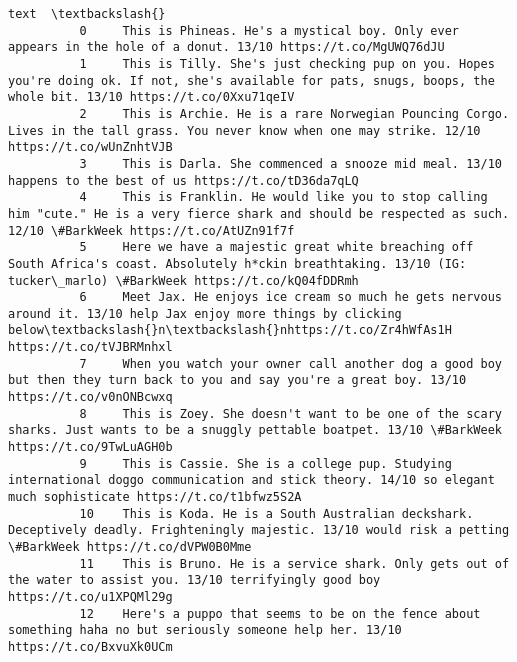 \documentclass[11pt]{article}
\begin{document}
\begin{Verbatim}[commandchars=\\\{\}]
                                                                                                                                                                                  text  \textbackslash{}
          0     This is Phineas. He's a mystical boy. Only ever appears in the hole of a donut. 13/10 https://t.co/MgUWQ76dJU                                                            
          1     This is Tilly. She's just checking pup on you. Hopes you're doing ok. If not, she's available for pats, snugs, boops, the whole bit. 13/10 https://t.co/0Xxu71qeIV       
          2     This is Archie. He is a rare Norwegian Pouncing Corgo. Lives in the tall grass. You never know when one may strike. 12/10 https://t.co/wUnZnhtVJB                        
          3     This is Darla. She commenced a snooze mid meal. 13/10 happens to the best of us https://t.co/tD36da7qLQ                                                                  
          4     This is Franklin. He would like you to stop calling him "cute." He is a very fierce shark and should be respected as such. 12/10 \#BarkWeek https://t.co/AtUZn91f7f       
          5     Here we have a majestic great white breaching off South Africa's coast. Absolutely h*ckin breathtaking. 13/10 (IG: tucker\_marlo) \#BarkWeek https://t.co/kQ04fDDRmh       
          6     Meet Jax. He enjoys ice cream so much he gets nervous around it. 13/10 help Jax enjoy more things by clicking below\textbackslash{}n\textbackslash{}nhttps://t.co/Zr4hWfAs1H https://t.co/tVJBRMnhxl   
          7     When you watch your owner call another dog a good boy but then they turn back to you and say you're a great boy. 13/10 https://t.co/v0nONBcwxq                           
          8     This is Zoey. She doesn't want to be one of the scary sharks. Just wants to be a snuggly pettable boatpet. 13/10 \#BarkWeek https://t.co/9TwLuAGH0b                       
          9     This is Cassie. She is a college pup. Studying international doggo communication and stick theory. 14/10 so elegant much sophisticate https://t.co/t1bfwz5S2A            
          10    This is Koda. He is a South Australian deckshark. Deceptively deadly. Frighteningly majestic. 13/10 would risk a petting \#BarkWeek https://t.co/dVPW0B0Mme               
          11    This is Bruno. He is a service shark. Only gets out of the water to assist you. 13/10 terrifyingly good boy https://t.co/u1XPQMl29g                                      
          12    Here's a puppo that seems to be on the fence about something haha no but seriously someone help her. 13/10 https://t.co/BxvuXk0UCm                                       

\end{Verbatim}
\end{document}
